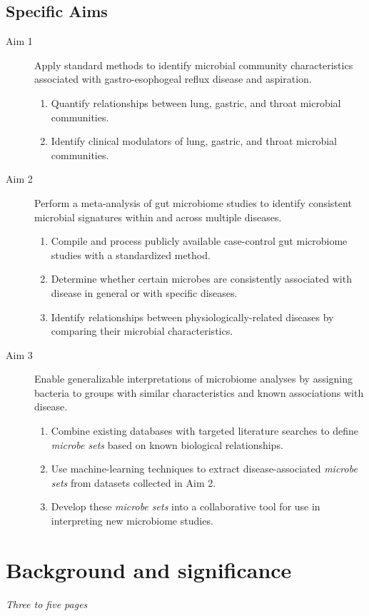 \documentclass[12pt]{article}
\begin{document}
\subsection{Specific Aims}
\begin{description}
	\item[Aim 1] Apply standard methods to identify microbial 
	community characteristics associated with gastro-esophogeal reflux 
	disease and aspiration.
	\begin{enumerate}
		\item Quantify relationships between lung, gastric, and throat microbial 
		communities.
		\item Identify clinical modulators of lung, gastric, and 
		throat microbial communities.
	\end{enumerate}
	\item[Aim 2] Perform a meta-analysis of gut 
	microbiome studies to identify consistent microbial signatures 
	within and across multiple diseases.
	\begin{enumerate}
		\item Compile and process publicly available case-control gut 
		microbiome studies with a standardized method.
		\item Determine whether certain microbes are consistently 
		associated with disease in general or with specific diseases.
		\item Identify relationships between physiologically-related 
		diseases by comparing their microbial characteristics.
	\end{enumerate}
	\item[Aim 3] Enable generalizable interpretations of microbiome 
	analyses by assigning bacteria to groups with similar characteristics 
	and known associations with disease.
	\begin{enumerate}
		\item Combine existing databases with targeted literature searches 
		to define \textit{microbe sets} based on known biological 
		relationships.
		\item Use machine-learning techniques to extract disease-associated 
		\textit{microbe sets} from datasets collected in Aim 2.
		\item Develop these \textit{microbe sets} into a collaborative 
		tool for use in interpreting new microbiome studies.
	\end{enumerate}
\end{description}
\newpage

\section{Background and significance}
\textit{Three to five pages}
\end{document}
